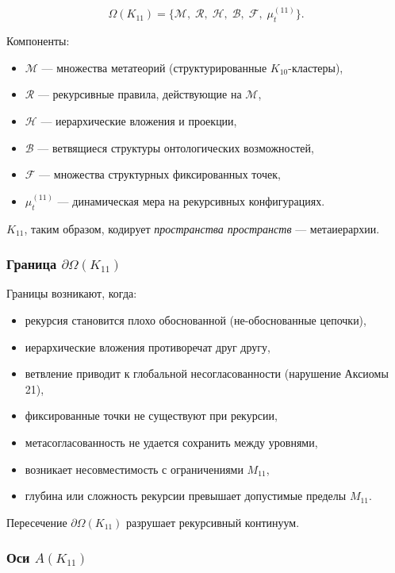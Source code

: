 \[
\Omega(K_{11})=
\{
\mathcal{M},\;
\mathcal{R},\;
\mathcal{H},\;
\mathcal{B},\;
\mathcal{F},\;
\mu^{(11)}_t
\}.
\]

Компоненты:
\begin{itemize}
    \item $\mathcal{M}$ — множества метатеорий (структурированные $K_{10}$-кластеры),
    \item $\mathcal{R}$ — рекурсивные правила, действующие на $\mathcal{M}$,
    \item $\mathcal{H}$ — иерархические вложения и проекции,
    \item $\mathcal{B}$ — ветвящиеся структуры онтологических возможностей,
    \item $\mathcal{F}$ — множества структурных фиксированных точек,
    \item $\mu^{(11)}_t$ — динамическая мера на рекурсивных конфигурациях.
\end{itemize}

$K_{11}$, таким образом, кодирует \emph{пространства пространств} — метаиерархии.

\subsubsection{Граница $\partial\Omega(K_{11})$}

Границы возникают, когда:
\begin{itemize}
    \item рекурсия становится плохо обоснованной (не-обоснованные цепочки),
    \item иерархические вложения противоречат друг другу,
    \item ветвление приводит к глобальной несогласованности (нарушение Аксиомы 21),
    \item фиксированные точки не существуют при рекурсии,
    \item метасогласованность не удается сохранить между уровнями,
    \item возникает несовместимость с ограничениями $M_{11}$,
    \item глубина или сложность рекурсии превышает допустимые пределы $M_{11}$.
\end{itemize}

Пересечение $\partial\Omega(K_{11})$ разрушает рекурсивный континуум.

\subsubsection{Оси $A(K_{11})$}


